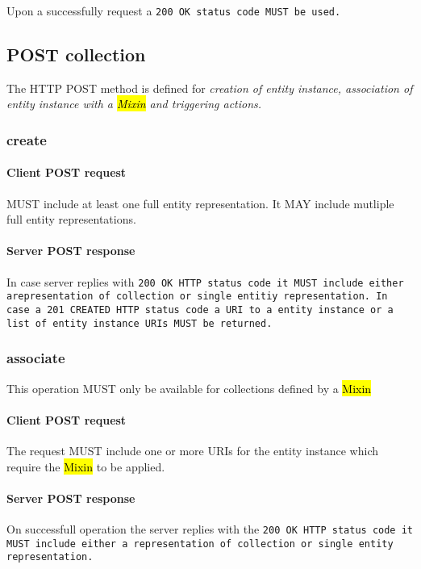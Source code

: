 \documentclass[10pt,a4paper]{article}
\begin{document}
Upon a successfully request a \tt{200 OK} status code MUST be used.

\subsection{POST collection}
The HTTP POST method is defined for \em{creation} of entity instance, \em{association} of entity instance with a \hl{Mixin} and triggering \em{actions}.

\subsubsection{create}

\paragraph{Client POST request}
MUST include at least one full entity representation. It MAY include mutliple full entity representations.

\paragraph{Server POST response}
In case server replies with \tt{200 OK} HTTP status code it MUST include either arepresentation of collection or single entitiy representation. In case a \tt{201 CREATED} HTTP status code a URI to a entity instance or a list of entity instance URIs MUST be returned.

\subsubsection{associate}
This operation MUST only be available for collections defined by a \hl{Mixin}

\paragraph{Client POST request}
The request MUST include one or more URIs for the entity instance which require the \hl{Mixin} to be applied.

\paragraph{Server POST response}
On successfull operation the server replies with the \tt{200 OK} HTTP status code it MUST include either a representation of collection or single entity representation. 
\end{document}
